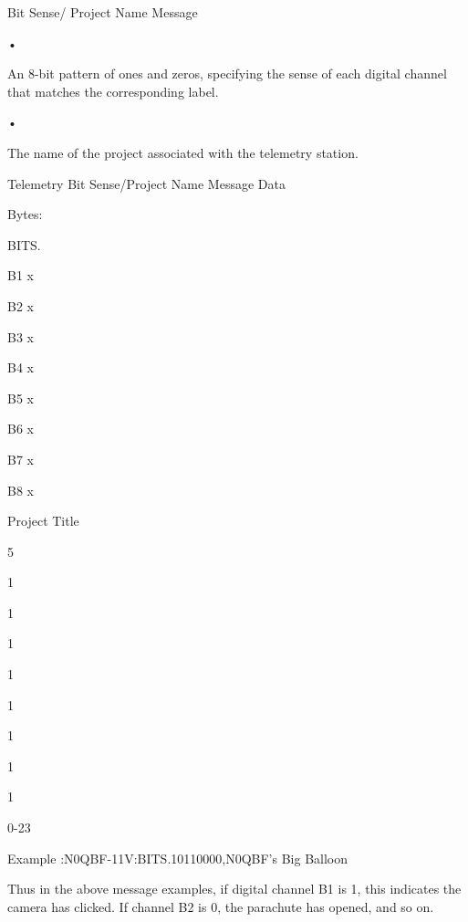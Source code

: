 Bit Sense/
Project Name
Message

•

An 8-bit pattern of ones and zeros, specifying the sense of each digital
channel that matches the corresponding label.

•

The name of the project associated with the telemetry station.

Telemetry Bit Sense/Project Name Message Data

Bytes:

BITS.

B1
x

B2
x

B3
x

B4
x

B5
x

B6
x

B7
x

B8
x

Project Title

5

1

1

1

1

1

1

1

1

0-23

Example
:N0QBF-11V:BITS.10110000,N0QBF’s Big Balloon

Thus in the above message examples, if digital channel B1 is 1, this indicates
the camera has clicked. If channel B2 is 0, the parachute has opened, and so
on.
